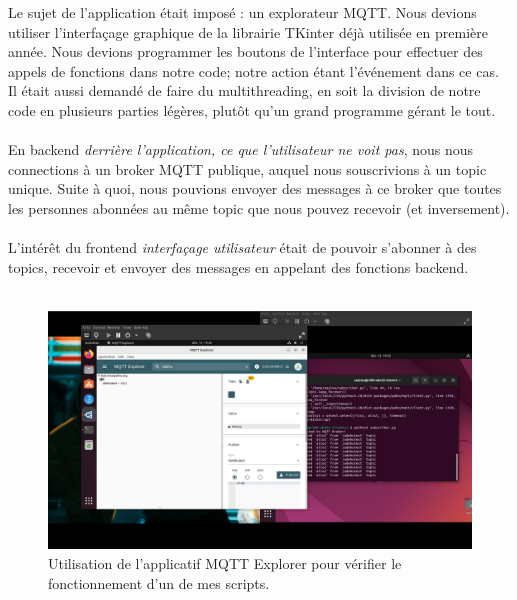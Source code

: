 Le sujet de l'application était imposé : un explorateur MQTT. Nous devions utiliser l'interfaçage graphique de la librairie TKinter déjà utilisée en première année. Nous devions programmer les boutons de l'interface pour effectuer des appels de fonctions dans notre code; notre action étant l'événement dans ce cas. Il était aussi demandé de faire du multithreading, en soit la division de notre code en plusieurs parties légères, plutôt qu'un grand programme gérant le tout.
\\ \\
En backend \textit{derrière l'application, ce que l'utilisateur ne voit pas}, nous nous connections à un broker MQTT publique, auquel nous souscrivions à un topic unique. Suite à quoi, nous pouvions envoyer des messages à ce broker que toutes les personnes abonnées au même topic que nous pouvez recevoir (et inversement).
\\ \\
L'intérêt du frontend \textit{interfaçage utilisateur} était de pouvoir s'abonner à des topics, recevoir et envoyer des messages en appelant des fonctions backend.
\\ \\
\begin{figure}[H]
      \centering
      \includegraphics[width=\textwidth - \textwidth / 8]{ressources/r309/00.png}
      \caption{Utilisation de l'applicatif MQTT Explorer pour vérifier le fonctionnement d'un de mes scripts.}
      \label{fig:r309-00}
\end{figure}